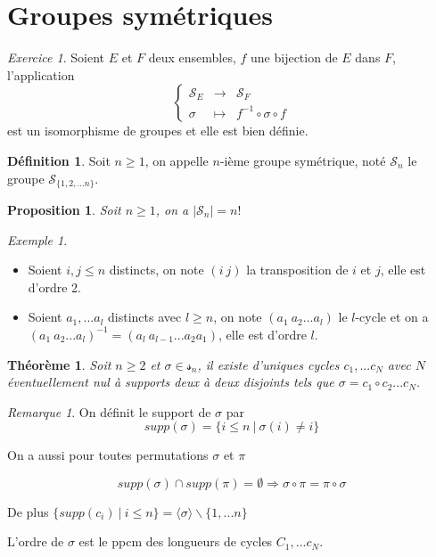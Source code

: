 \documentclass[]{article}
\newtheorem{mythm}{Théorème}
\newtheorem{myproposition}{Proposition}
\theoremstyle{remark}
\newtheorem{myrem}{Remarque}
\newtheorem{myexer}{Exercice}
\newtheorem{myexmpl}{Exemple}
\theoremstyle{definition}
\newtheorem{mydef}{Définition}
\newcommand{\anonfunc}[4]{
\left\{ \begin{array}{lcl}
	#1 & \longrightarrow & #2 \\
	#3 & \longmapsto & #4
\end{array}
\right.
}
\begin{document}
\part{Groupes symétriques}

\begin{myexer}
	Soient $E$ et $F$ deux ensembles, $f$ une bijection de $E$ dans $F$, l'application
	$$\anonfunc{\mathcal{S}_E}{\mathcal{S}_F}{\sigma}{f^{-1} \circ \sigma \circ f}$$
	est un isomorphisme de groupes et elle est bien définie.
\end{myexer}

\begin{mydef}
	Soit $n \geqslant 1$, on appelle $n$-ième groupe symétrique, noté $\mathcal{S}_n$ le groupe $\mathcal{S}_{\{1, 2, ...n\}}$.
\end{mydef}

\begin{myproposition}
	Soit $n \geqslant 1$, on a $\left|\mathcal{S}_n\right| = n!$
\end{myproposition}

\begin{myexmpl}
	\leavevmode
	\begin{itemize}
		\item Soient $i, j \leqslant n$ distincts, on note $(i ~ j)$ la transposition de $i$ et $j$, elle est d'ordre 2.
		\item Soient $a_1, ...a_l$ distincts avec $l \geqslant n$, on note $(a_1 ~ a_2 ... a_l)$ le $l$-cycle et on a $(a_1 ~ a_2 ... a_l)^{-1} = (a_l ~ a_{l-1} ... a_2 a_1)$, elle est d'ordre $l$.
	\end{itemize}
\end{myexmpl}

\begin{mythm}
	Soit $n \geqslant 2$ et $\sigma \in \mathcal{s}_n$, il existe d'uniques cycles $c_1, ... c_N$ avec $N$ éventuellement nul à supports deux à deux disjoints tels que $\sigma = c_1 \circ c_2 ... c_N$.
\end{mythm}

\begin{myrem}
	On définit le support de $\sigma$ par
	$$supp(\sigma) = \{i \leqslant n ~ | ~ \sigma(i) \neq i\}$$
	
	On a aussi pour toutes permutations $\sigma$ et $\pi$
	
	$$supp(\sigma) \cap supp(\pi) = \emptyset \Longrightarrow \sigma \circ \pi = \pi \circ \sigma$$
	
	De plus $\{supp(c_i) ~ | ~ i \leqslant n\} = \langle\sigma\rangle \backslash \{1, ...n\}$
	
	L'ordre de $\sigma$ est le ppcm des longueurs de cycles $C_1, ...c_N$.
\end{myrem}
\end{document}
